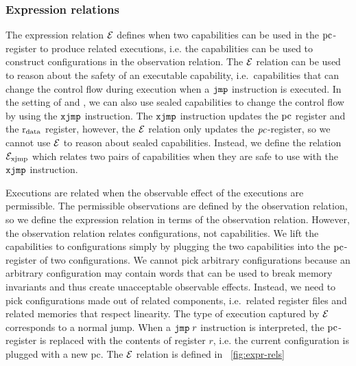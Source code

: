 \begin{jversion}
\subsubsection{Expression relations}
The expression relation $\mathcal{E}$ defines when two capabilities can be used in the $\mathrm{pc}$-register to produce related executions, i.e. the capabilities can be used to construct configurations in the observation relation.
The $\mathcal{E}$ relation can be used to reason about the safety of an executable capability, i.e.\ capabilities that can change the control flow during execution when a $\tjmp{}$ instruction is executed.
In the setting of \srccm{} and \trgcm{}, we can also use sealed capabilities to change the control flow by using the $\txjmp{}{}$ instruction.
The $\txjmp{}{}$ instruction updates the $\mathrm{pc}$ register and the $\mathrm{r}_\mathrm{data}$ register, however, the $\mathcal{E}$ relation only updates the $\mathit{pc}$-register, so we cannot use $\mathcal{E}$ to reason about sealed capabilities.
Instead, we define the relation $\mathcal{E}_\mathrm{xjmp}$ which relates two pairs of capabilities when they are safe to use with the $\txjmp{}{}$ instruction.

Executions are related when the observable effect of the executions are permissible.
The permissible observations are defined by the observation relation, so we define the expression relation in terms of the observation relation.
However, the observation relation relates configurations, not capabilities.
We lift the capabilities to configurations simply by plugging the two capabilities into the $\mathrm{pc}$-register of two configurations.
We cannot pick arbitrary configurations because an arbitrary configuration may contain words that can be used to break memory invariants and thus create unacceptable observable effects.
Instead, we need to pick configurations made out of related components, i.e.\ related register files and related memories that respect linearity.
The type of execution captured by $\mathcal{E}$ corresponds to a normal jump.
When a $\tjmp r$ instruction is interpreted, the $\mathrm{pc}$-register is replaced with the contents of register $r$, i.e. the current configuration is plugged with a new pc.
The $\mathcal{E}$ relation is defined in \figurename~\ref{fig:expr-rels}


\end{jversion}
